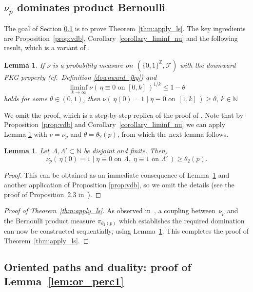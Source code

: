 \documentclass[a4paper,12pt]{article}
\newtheorem  {lemma}         [theorem]{Lemma}
\newcommand{\Z}{\mathbb{Z}}
\begin{document}
\subsection{$\nu_p$ dominates product Bernoulli}\label{subsect_oriented_perco_dominates_ber}
The goal of Section \ref{subsect_oriented_perco_dominates_ber} is to prove Theorem~\ref{thm:apply_ls}. The key ingredients are
Proposition~\ref{prop:vdb}, Corollary~\ref{corollary_liminf_nu} and the following result, which
is a variant of \cite[Proposition 2.2]{LS06}.
\begin{lemma}\label{lem:quase_dom} If $\nu$ is a probability measure on~$(\{0,1\}^{\Z}, \mathcal{F})$ with the downward FKG property (cf.\ Definition \ref{downward_fkg})
and
\begin{equation}
 \liminf_{k \to \infty} \nu(\,  \eta \equiv 0 \text{ on }  [0,k] \, )^{1/k} \leq 1-\theta
\end{equation}
holds for some $\theta \in (0,1)$, then
$\nu(\, \eta(0) = 1 \mid \eta \equiv 0 \text{ on } [1,k]\, ) \geq \theta$, $k \in \mathbb{N}$
\end{lemma}	
We omit the proof, which is a step-by-step replica of the proof of \cite[Proposition 2.2]{LS06}. Note that by
Proposition~\ref{prop:vdb} and Corollary~\ref{corollary_liminf_nu} we can apply Lemma \ref{lem:quase_dom} with $\nu=\nu_p$ and $\theta=\theta_2(p)$, from
which the next lemma follows.
\begin{lemma}\label{lem:quase2}
Let~$\Lambda, \Lambda' \subset \mathbb{N}$ be disjoint and finite. Then,
$$\nu_p(\, \eta(0)= 1 \mid \eta \equiv 0 \text{ on } \Lambda,\; \eta \equiv 1 \text{ on } \Lambda' \, ) \geq \theta_2(p). $$
\end{lemma}
\begin{proof}
This can be obtained as an immediate consequence of Lemma~\ref{lem:quase_dom} and another application of Proposition \ref{prop:vdb}, so we omit the details (see the proof of Proposition~2.3 in~\cite{LS06}).
\end{proof}
\begin{proof}[Proof of Theorem~\ref{thm:apply_ls}]
As observed in~\cite{LS06}, a coupling between~$\nu_p$ and the Bernoulli product measure $\pi_{\theta_2(p)}$ which establishes the required domination can now be constructed sequentially, using Lemma~\ref{lem:quase2}. This completes the proof of Theorem~\ref{thm:apply_ls}.
\end{proof}

\subsection{Oriented paths and duality: proof of Lemma~\ref{lem:or_perc1}}\label{subsection_oriented_paths_and_duality}
\end{document}
